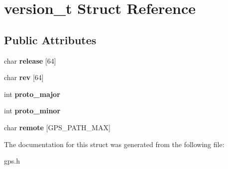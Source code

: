 \hypertarget{structversion__t}{\section{version\-\_\-t \-Struct \-Reference}
\label{structversion__t}
}
\subsection*{\-Public \-Attributes}
\begin{DoxyCompactItemize}
\item 
\hypertarget{structversion__t_a57a613c040936ef62fc7482610a3689f}{char {\bfseries release} \mbox{[}64\mbox{]}}\label{structversion__t_a57a613c040936ef62fc7482610a3689f}

\item 
\hypertarget{structversion__t_a672db2199d9e8236ab374af202feef5a}{char {\bfseries rev} \mbox{[}64\mbox{]}}\label{structversion__t_a672db2199d9e8236ab374af202feef5a}

\item 
\hypertarget{structversion__t_a0feff27b0c0f0fbf9827683bf66ab8c7}{int {\bfseries proto\-\_\-major}}\label{structversion__t_a0feff27b0c0f0fbf9827683bf66ab8c7}

\item 
\hypertarget{structversion__t_a1586892abfe0800c38d967d2ddcadfce}{int {\bfseries proto\-\_\-minor}}\label{structversion__t_a1586892abfe0800c38d967d2ddcadfce}

\item 
\hypertarget{structversion__t_aacdb8721f8e9be778d0a9f1506548a7b}{char {\bfseries remote} \mbox{[}\-G\-P\-S\-\_\-\-P\-A\-T\-H\-\_\-\-M\-A\-X\mbox{]}}\label{structversion__t_aacdb8721f8e9be778d0a9f1506548a7b}

\end{DoxyCompactItemize}


\-The documentation for this struct was generated from the following file\-:\begin{DoxyCompactItemize}
\item 
gps.\-h\end{DoxyCompactItemize}
